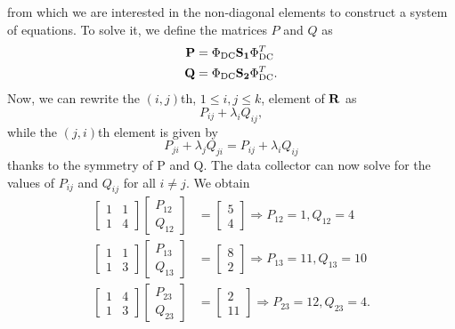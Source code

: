 \documentclass{article}
\begin{document}
from which we are interested in the non-diagonal elements to construct a system of equations. To solve it, we define the matrices $P$ and $Q$ as
\begin{align*}
\vb{P} &= \Phi_{\text{DC}}\vb{S_1} \Phi_{\text{DC}}^T \\
\vb{Q} &= \Phi_{\text{DC}}\vb{S_2} \Phi_{\text{DC}}^T .
\end{align*}
Now, we can rewrite the $(i, j)$th, $1 \leq i, j\leq k$, element of $\vb{R}$ as
\begin{equation*}
P_{ij} + \lambda_iQ_{ij},
\end{equation*}
while the $(j,i)$th element is given by
\begin{equation*}
P_{ji} + \lambda_jQ_{ji} = P_{ij} + \lambda_iQ_{ij}
\end{equation*}
thanks to the symmetry of P and Q. The data collector can now solve for the values of $P_{ij}$ and $Q_{ij}$ for all $i \neq j$. We obtain
\begin{align*}
\begin{bmatrix}
1 & 1\\
1 & 4
\end{bmatrix}
\begin{bmatrix}
P_{12}\\
Q_{12}
\end{bmatrix}
&=
\begin{bmatrix}
5\\
4
\end{bmatrix}
\Rightarrow
P_{12}=1, Q_{12}=4\\
\begin{bmatrix}
1 & 1\\
1 & 3
\end{bmatrix}
\begin{bmatrix}
P_{13}\\
Q_{13}
\end{bmatrix}
&=
\begin{bmatrix}
8\\
2
\end{bmatrix}
\Rightarrow
P_{13}=11, Q_{13}=10\\
\begin{bmatrix}
1 & 4\\
1 & 3
\end{bmatrix}
\begin{bmatrix}
P_{23}\\
Q_{23}
\end{bmatrix}
&=
\begin{bmatrix}
2\\
11
\end{bmatrix}
\Rightarrow
P_{23}=12, Q_{23}=4.
\end{align*}
\end{document}
